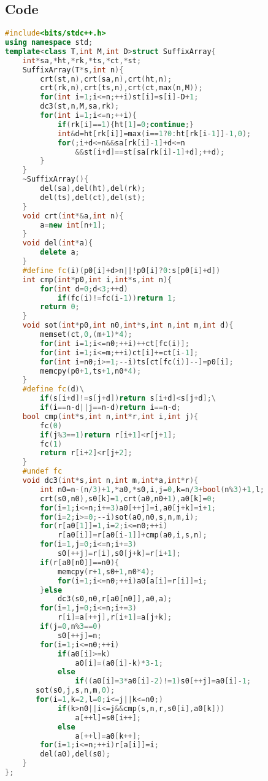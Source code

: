 \documentclass{book}
\begin{document}
\subsection*{Code}
\begin{lstlisting}[language=C++,title={Suffix Array (DC3 Algorithm).hpp (2656 bytes, 82 lines)}]
#include<bits/stdc++.h>
using namespace std;
template<class T,int M,int D>struct SuffixArray{
    int*sa,*ht,*rk,*ts,*ct,*st;
    SuffixArray(T*s,int n){
        crt(st,n),crt(sa,n),crt(ht,n);
        crt(rk,n),crt(ts,n),crt(ct,max(n,M));
        for(int i=1;i<=n;++i)st[i]=s[i]-D+1;
        dc3(st,n,M,sa,rk);
        for(int i=1;i<=n;++i){
            if(rk[i]==1){ht[1]=0;continue;}
            int&d=ht[rk[i]]=max(i==1?0:ht[rk[i-1]]-1,0);
            for(;i+d<=n&&sa[rk[i]-1]+d<=n
                &&st[i+d]==st[sa[rk[i]-1]+d];++d);
        }
    }
    ~SuffixArray(){
        del(sa),del(ht),del(rk);
        del(ts),del(ct),del(st);
    }
    void crt(int*&a,int n){
        a=new int[n+1];
    }
    void del(int*a){
        delete a;
    }
    #define fc(i)(p0[i]+d>n||!p0[i]?0:s[p0[i]+d])
    int cmp(int*p0,int i,int*s,int n){
        for(int d=0;d<3;++d)
            if(fc(i)!=fc(i-1))return 1;
        return 0;
    }
    void sot(int*p0,int n0,int*s,int n,int m,int d){
        memset(ct,0,(m+1)*4);
        for(int i=1;i<=n0;++i)++ct[fc(i)];
        for(int i=1;i<=m;++i)ct[i]+=ct[i-1];
        for(int i=n0;i>=1;--i)ts[ct[fc(i)]--]=p0[i];
        memcpy(p0+1,ts+1,n0*4);
    }
    #define fc(d)\
        if(s[i+d]!=s[j+d])return s[i+d]<s[j+d];\
        if(i==n-d||j==n-d)return i==n-d;
    bool cmp(int*s,int n,int*r,int i,int j){
        fc(0)
        if(j%3==1)return r[i+1]<r[j+1];
        fc(1)
        return r[i+2]<r[j+2];
    }
    #undef fc
    void dc3(int*s,int n,int m,int*a,int*r){
        int n0=n-(n/3)+1,*a0,*s0,i,j=0,k=n/3+bool(n%3)+1,l;
        crt(s0,n0),s0[k]=1,crt(a0,n0+1),a0[k]=0;
        for(i=1;i<=n;i+=3)a0[++j]=i,a0[j+k]=i+1;
        for(i=2;i>=0;--i)sot(a0,n0,s,n,m,i);
        for(r[a0[1]]=1,i=2;i<=n0;++i)
            r[a0[i]]=r[a0[i-1]]+cmp(a0,i,s,n);
        for(i=1,j=0;i<=n;i+=3)
            s0[++j]=r[i],s0[j+k]=r[i+1];
        if(r[a0[n0]]==n0){
            memcpy(r+1,s0+1,n0*4);
            for(i=1;i<=n0;++i)a0[a[i]=r[i]]=i;
        }else
            dc3(s0,n0,r[a0[n0]],a0,a);
        for(i=1,j=0;i<=n;i+=3)
            r[i]=a[++j],r[i+1]=a[j+k];
        if(j=0,n%3==0)
            s0[++j]=n;
        for(i=1;i<=n0;++i)
            if(a0[i]>=k)
                a0[i]=(a0[i]-k)*3-1;
            else
                if((a0[i]=3*a0[i]-2)!=1)s0[++j]=a0[i]-1;
       sot(s0,j,s,n,m,0);
       for(i=1,k=2,l=0;i<=j||k<=n0;)
            if(k>n0||i<=j&&cmp(s,n,r,s0[i],a0[k]))
                a[++l]=s0[i++];
            else
                a[++l]=a0[k++];
        for(i=1;i<=n;++i)r[a[i]]=i;
        del(a0),del(s0);
    }
};
\end{lstlisting}
\end{document}
